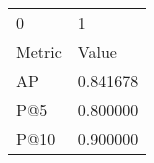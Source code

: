 \begin{tabular}{ll}
0 & 1 \\
Metric & Value \\
AP & 0.841678 \\
P@5 & 0.800000 \\
P@10 & 0.900000 \\
\end{tabular}
